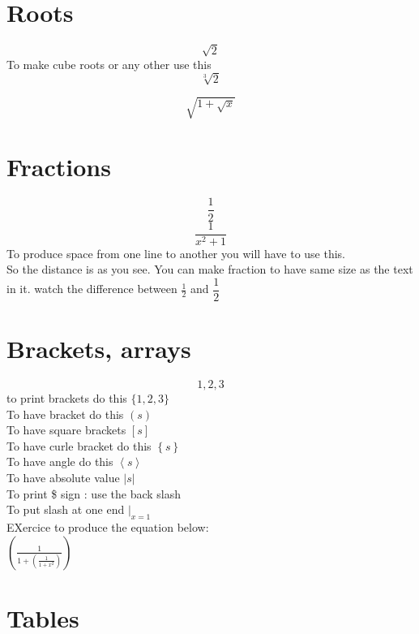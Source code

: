 \documentclass[12pt]{article}
\begin{document}
\section{Roots} 
$$\sqrt{2}$$
To make cube roots or any other use this 
$$\sqrt[3]{2}$$

$$\sqrt{1+\sqrt{x}}$$
\maketitle
\section{Fractions}
$$\frac{1}{2}$$
$$\frac{1}{x^2+1}$$
To produce space from one line to another you will have to use this.\\[16pt]
So the distance is as you see.
You can make fraction to have same size as the text in it. watch the difference
between $\frac{1}{2}$ and $\dfrac{1}{2}$
\maketitle
\section{Brackets, arrays}
$${1,2,3}$$  %
to print brackets do this $\{ 1,2,3 \}$ \\
To have bracket do this $\left(  s   \right)$ \\
To have square brackets $\left[ s \right]$ \\
To have curle bracket do this $\left\{ s  \right\}$ \\
To have angle do this $\left \langle  s \right\rangle $ \\
To have absolute value $\left |  s \right | $ \\
To print \$ sign : use the back slash \\
To put slash at one end $\left.  \right|_{x=1}$ \\

EXercice 
to produce the equation below:\\
$\left(\frac{1}{1+{\left(\frac {1}{1+x^2} \right)}} \right)$
\maketitle
\section{Tables}
\end{document}
